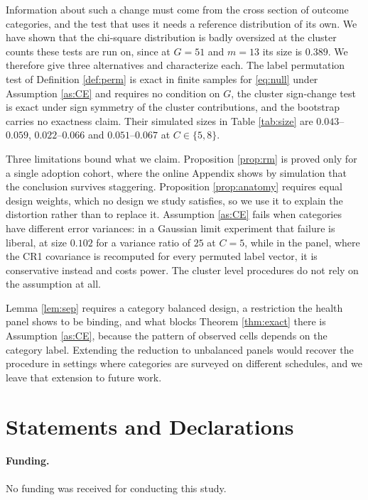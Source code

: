 \documentclass[12pt]{article}
\theoremstyle{definition}
\numberwithin{equation}{section}
\begin{document}
Information about such a change must come from the cross section of outcome
categories, and the test that uses it needs a reference distribution of its own.
We have shown that the chi-square distribution is badly oversized at the cluster
counts these tests are run on, since at $G = 51$ and $m = 13$ its size is
$0.389$. We therefore give three alternatives and characterize each. The label
permutation test of Definition \ref{def:perm} is exact in finite samples for
\eqref{eq:null} under Assumption \ref{as:CE} and requires no condition on $G$,
the cluster sign-change test is exact under sign symmetry of the cluster
contributions, and the bootstrap carries no exactness claim. Their simulated
sizes in Table \ref{tab:size} are $0.043$--$0.059$, $0.022$--$0.066$ and
$0.051$--$0.067$ at $C \in \{5,8\}$.

Three limitations bound what we claim. Proposition \ref{prop:rm} is proved only
for a single adoption cohort, where the online Appendix shows by simulation that
the conclusion survives staggering. Proposition \ref{prop:anatomy} requires equal
design weights, which no design we study satisfies, so we use it to explain the
distortion rather than to replace it. Assumption \ref{as:CE} fails when categories
have different error variances: in a Gaussian limit experiment that failure is
liberal, at size $0.102$ for a variance ratio of $25$ at $C = 5$, while in the
panel, where the CR1 covariance is recomputed for every permuted label vector, it
is conservative instead and costs power. The cluster level procedures do not rely
on the assumption at all.

Lemma \ref{lem:sep} requires a category balanced design, a restriction the
health panel shows to be binding, and what blocks Theorem \ref{thm:exact} there
is Assumption \ref{as:CE}, because the pattern of observed cells depends on the
category label. Extending the reduction to unbalanced panels would recover the
procedure in settings where categories are surveyed on different schedules, and
we leave that extension to future work.

\section*{Statements and Declarations}

\paragraph{Funding.} No funding was received for conducting this study.
\end{document}
